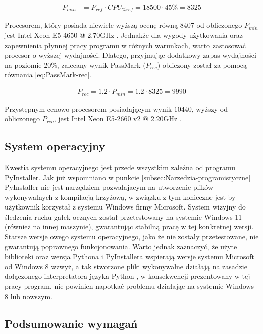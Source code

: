 \documentclass[a4paper,twoside,12pt]{book}
\begin{document}
\begin{align}
	P_{min} &= P_{ref} \cdot CPU_{\%ref} = 18500 \cdot 45\% = 8325
	\label{eq:PassMark-min}
\end{align}

Procesorem, który posiada niewiele wyższą ocenę równą $8407$ od obliczonego $P_{min}$ jest Intel Xeon E5-4650 @ 2.70GHz \cite{bib:min-procesor-benchmark}. Jednakże dla wygody użytkowania oraz zapewnienia płynnej pracy programu w różnych warunkach, warto zastosować procesor o wyższej wydajności. Dlatego, przyjmując dodatkowy zapas wydajności na poziomie 20\%, zalecany wynik PassMark ($P_{rec}$) obliczony został za pomocą równania \ref{eq:PassMark-rec}.

\begin{align}
	P_{rec} = 1.2 \cdot P_{min} = 1.2 \cdot 8325 = 9990
	\label{eq:PassMark-rec}
\end{align}

Przystępnym cenowo procesorem posiadającym wynik $10440$, wyższy od obliczonego $P_{rec}$, jest Intel Xeon E5-2660 v2 @ 2.20GHz \cite{bib:ref-procesor-benchmark}. 

\subsection{System operacyjny}
\label{subsec:System-operacyjny}

Kwestia systemu operacyjnego jest przede wszystkim zależna od programu PyInstaller. Jak już wspomniano w punkcie \ref{subsec:Narzedzia-programistyczne} PyInstaller nie jest narzędziem pozwalajacym na utworzenie plików wykonywalnych z kompilacją krzyżową, w związku z tym konieczne jest by użytkownik korzystał z systemu Windows firmy Microsoft. System wizyjny do śledzenia ruchu gałek ocznych został przetestowany na systemie Windows 11 (również na innej maszynie), gwarantując stabilną pracę w tej konkretnej wersji. Starsze wersje owego systemu operacyjnego, jako że nie zostały przetestowane, nie gwarantują poprawnego funkcjonowania. Warto jednak zaznaczyć, że użyte biblioteki oraz wersja Pythona i PyInstallera wspierają wersje systemu Microsoft od Windows 8 wzwyż, a tak stworzone pliki wykonywalne działają na zasadzie dołączonego interpretatora języka Python \cite{bib:PyInstaller-how-it-works}, w konsekwencji prezentowany w tej pracy program, nie powinien napotkać problemu działając na systemie Windows 8 lub nowszym.

\subsection{Podsumowanie wymagań}
\label{subsec:Podsumowanie-wymagan}
\end{document}
